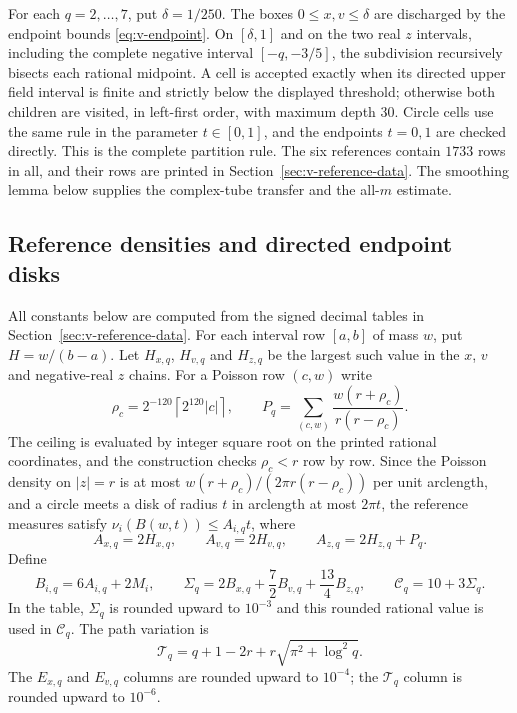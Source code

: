 For each $q=2,\ldots,7$, put $\delta=1/250$.  The boxes
$0\le x,v\le\delta$ are discharged by the endpoint bounds
\eqref{eq:v-endpoint}.  On $[\delta,1]$ and on the two real $z$ intervals,
including the complete negative interval $[-q,-3/5]$, the subdivision
recursively bisects each rational midpoint.  A cell is accepted exactly when
its directed upper field interval is finite and strictly below the displayed
threshold; otherwise both children are visited, in left-first
order, with maximum depth $30$.  Circle cells use the same rule in the
parameter $t\in[0,1]$, and the endpoints $t=0,1$ are checked directly.
This is the complete partition rule.  The six references contain $1733$ rows
in all, and their rows are printed in Section~\ref{sec:v-reference-data}.
The smoothing lemma below supplies the complex-tube transfer and the all-$m$
estimate.

\subsection{Reference densities and directed endpoint disks}
\label{subsec:v-allm-data}

All constants below are computed from the signed decimal tables in
Section~\ref{sec:v-reference-data}.  For
each interval row $[a,b]$ of mass $w$, put $H=w/(b-a)$.  Let $H_{x,q}$,
$H_{v,q}$ and $H_{z,q}$ be the largest such value in the $x$, $v$ and
negative-real $z$ chains.  For a Poisson row $(c,w)$ write
\[
 \rho_c=2^{-120}\left\lceil2^{120}|c|\right\rceil,
 \qquad
 P_q=\sum_{(c,w)}\frac{w(r+\rho_c)}{r(r-\rho_c)}.
\]
The ceiling is evaluated by integer square root on the printed rational
coordinates, and the construction checks $\rho_c<r$ row by row.  Since the
Poisson density on $|z|=r$ is at most
$w(r+\rho_c)/(2\pi r(r-\rho_c))$ per unit arclength, and a circle meets a
disk of radius $t$ in arclength at most $2\pi t$, the reference measures
satisfy $\nu_i(B(w,t))\le A_{i,q}t$, where
\[
 A_{x,q}=2H_{x,q},\qquad A_{v,q}=2H_{v,q},\qquad
 A_{z,q}=2H_{z,q}+P_q.
\]
Define
\[
 B_{i,q}=6A_{i,q}+2M_i,\qquad
 \Sigma_q=2B_{x,q}+\frac72B_{v,q}+\frac{13}{4}B_{z,q},
 \qquad \mathcal C_q=10+3\Sigma_q.
\]
In the table, $\Sigma_q$ is rounded upward to $10^{-3}$ and this rounded
rational value is used in $\mathcal C_q$.  The path variation is
\[
 \mathcal T_q=q+1-2r+r\sqrt{\pi^2+\log^2q}.
\]
The $E_{x,q}$ and $E_{v,q}$ columns are rounded upward to $10^{-4}$;
the $\mathcal T_q$ column is rounded upward to $10^{-6}$.

